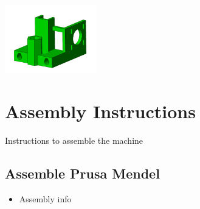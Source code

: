 \documentclass[11pt]{article}
\begin{document}
\includegraphics[width=4cm]{images/x-end-motor.jpg}
\newpage
\section{Assembly Instructions}
Instructions to assemble the machine
\subsection{Assemble Prusa Mendel}
\begin{itemize}
\item Assembly info
\end{itemize}
\end{document}
